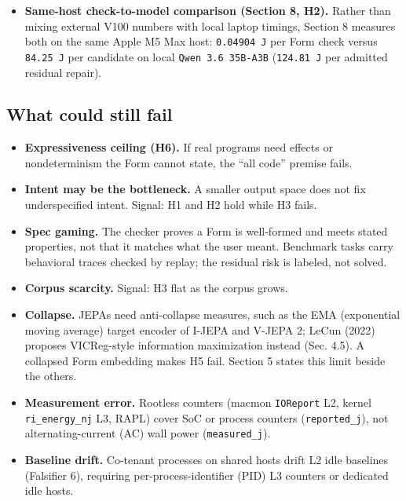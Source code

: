 \documentclass[10pt,letterpaper]{article}
\providecommand{\tightlist}{\setlength{\itemsep}{1pt}\setlength{\parskip}{0pt}}
\begin{document}
\begin{itemize}
  ``multi-purpose, generative architectures are orders of magnitude more
  expensive than task-specific systems'', partly because a generator
  chooses among ``an entire vocabulary'' (Luccioni et al., 2024,
  abstract, PDF p.~1; Sec. 4.1 and Table 2, PDF p.~6; Sec. 4.2.1, PDF
  p.~8).
\item
  \textbf{Same-host check-to-model comparison (Section 8, H2).} Rather
  than mixing external V100 numbers with local laptop timings, Section 8
  measures both on the same Apple M5 Max host: \texttt{0.\allowbreak{}04904\ J} per
  Form check versus \texttt{84.25\ J} per candidate on local
  \texttt{Qwen\ 3.\allowbreak{}6\ 35B-\allowbreak{}A3B} (\texttt{124.81\ J} per admitted residual
  repair).
\end{itemize}

\subsection{What could still fail}\label{what-could-still-fail}

\begin{itemize}
\tightlist
\item
  \textbf{Expressiveness ceiling (H6).} If real programs need effects or
  nondeterminism the Form cannot state, the ``all code'' premise fails.
\item
  \textbf{Intent may be the bottleneck.} A smaller output space does not
  fix underspecified intent. Signal: H1 and H2 hold while H3 fails.
\item
  \textbf{Spec gaming.} The checker proves a Form is well-formed and
  meets stated properties, not that it matches what the user meant.
  Benchmark tasks carry behavioral traces checked by replay; the
  residual risk is labeled, not solved.
\item
  \textbf{Corpus scarcity.} Signal: H3 flat as the corpus grows.
\item
  \textbf{Collapse.} JEPAs need anti-collapse measures, such as the EMA
  (exponential moving average) target encoder of I-JEPA and V-JEPA 2;
  LeCun (2022) proposes VICReg-style information maximization instead
  (Sec. 4.5). A collapsed Form embedding makes H5 fail. Section 5 states
  this limit beside the others.
\item
  \textbf{Measurement error.} Rootless counters (macmon
  \texttt{IOReport} L2, kernel \texttt{ri\_\allowbreak{}energy\_\allowbreak{}nj} L3, RAPL) cover
  SoC or process counters (\texttt{reported\_\allowbreak{}j}), not
  alternating-current (AC) wall power (\texttt{measured\_\allowbreak{}j}).
\item
  \textbf{Baseline drift.} Co-tenant processes on shared hosts drift L2
  idle baselines (Falsifier 6), requiring per-process-identifier (PID)
  L3 counters or dedicated idle hosts.
\end{itemize}
\end{document}
